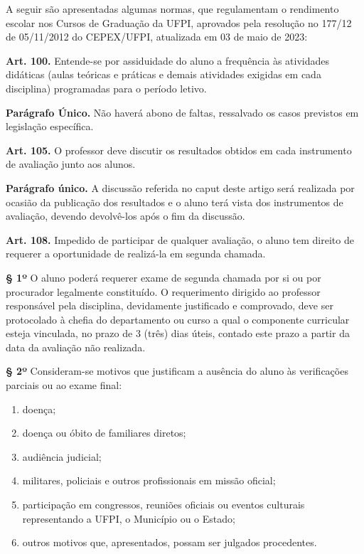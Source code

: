 \documentclass[a4paper, 12pt]{article}
\begin{document}
A seguir são apresentadas algumas normas, que regulamentam o rendimento escolar
nos Cursos de Graduação da UFPI, aprovados pela resolução no 177/12 de 05/11/2012 do CEPEX/UFPI, atualizada em 03 de maio de 2023:

\vspace{10pt}

\noindent\textbf{Art. 100.} Entende-se por assiduidade do aluno a frequência às atividades didáticas (aulas teóricas e práticas e demais atividades exigidas em cada disciplina) programadas para o período letivo.

\textbf{Parágrafo Único.} Não haverá abono de faltas, ressalvado os casos previstos em legislação específica.

\noindent\textbf{Art. 105.} O professor deve discutir os resultados obtidos em cada instrumento de avaliação junto aos alunos.

\textbf{Parágrafo único.} A discussão referida no caput deste artigo será realizada por ocasião da publicação dos resultados e o aluno terá vista dos instrumentos de avaliação, devendo devolvê-los após o fim da discussão.

\noindent\textbf{Art. 108.} Impedido de participar de qualquer avaliação, o aluno tem direito de requerer a oportunidade de realizá-la em segunda chamada.

\textbf{§ 1º} O aluno poderá requerer exame de segunda chamada por si ou por procurador legalmente constituído. O requerimento dirigido ao professor responsável pela disciplina, devidamente justificado e comprovado, deve ser protocolado à chefia do departamento ou curso a qual o componente curricular esteja vinculada, no prazo de 3 (três) dias úteis, contado este prazo a partir da data da avaliação não realizada.

\textbf{§ 2º} Consideram-se motivos que justificam a ausência do aluno às verificações parciais ou ao exame final:
\begin{enumerate}[label= \alph*)]
    \item doença;
    \item doença ou óbito de familiares diretos;
    \item audiência judicial;
    \item militares, policiais e outros profissionais em missão oficial;
    \item participação em congressos, reuniões oficiais ou eventos culturais
    representando a UFPI, o Município ou o Estado;
    \item outros motivos que, apresentados, possam ser julgados procedentes.
\end{enumerate}
\end{document}
